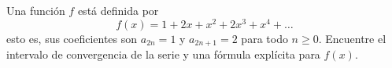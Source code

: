 \item Una función $f$ está definida por
    \[ f(x) = 1 + 2x + x^2 + 2x^3 + x^4 + \dots \]
    esto es, sus coeficientes son $a_{2n} = 1$ y $a_{2n+1} = 2$ para todo $n \ge 0$. Encuentre el intervalo de convergencia de la serie y una fórmula explícita para $f(x)$.
